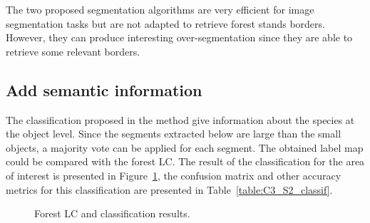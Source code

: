 The two proposed segmentation algorithms are very efficient for image segmentation tasks \citep{guigues2006scale, felzenszwalb2004efficient} but are not adapted to retrieve forest stands borders. However, they can produce interesting over-segmentation since they are able to retrieve some relevant borders.

\subsection{Add semantic information}
The classification proposed in the method give information about the species at the object level. Since the segments extracted below are large than the small objects, a majority vote can be applied for each segment. The obtained label map could be compared with the forest LC.
The result of the classification for the area of interest is presented in Figure~\ref{fig:C3_S2_classif}, the confusion matrix and other accuracy metrics for this classification are presented in Table~\ref{table:C3_S2_classif}.

\begin{figure}[htbp]
\begin{center}
\begingroup
\captionsetup[subfigure]{width=0.375\textwidth}
\hspace*{0.05\textwidth}
\endgroup
\caption{Forest LC and classification results.}
\label{fig:C3_S2_classif}
\end{center}
\end{figure}

